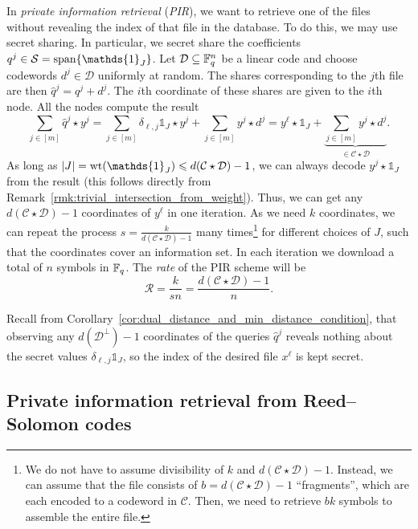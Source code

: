 \documentclass[../main.tex]{subfiles}
\begin{document}
In \emph{private information retrieval} (\emph{PIR}), we want to retrieve one of the files without revealing the index of that file in the database. To do this, we may use secret sharing. In particular, we secret share the coefficients $q^j \in \mathcal{S} = \spn\{\mathds{1}_J\}$. Let $\mathcal{D} \subseteq \mathbb{F}_q^n$ be a linear code and choose codewords $d^j \in \mathcal{D}$ uniformly at random. The shares corresponding to the $j$th file are then $\hat{q}^j = q^j + d^j$. The $i$th coordinate of these shares are given to the $i$th node. All the nodes compute the result
\begin{equation*}
    \sum_{j \in [m]} \hat{q}^j \star y^j = \sum_{j \in [m]} \delta_{\ell, j} \mathds{1}_J \star y^j + \sum_{j \in [m]} y^j \star d^j = y^\ell \star \mathds{1}_J + \underbrace{\sum_{j \in [m]} y^j \star d^j}_{\in \mathcal{C} \star \mathcal{D}}.
\end{equation*}
As long as $\lvert J \rvert = \wt(\mathds{1}_J) \leq d(\mathcal{C} \star \mathcal{D}) - 1$, we can always decode $y^j \star \mathds{1}_J$ from the result (this follows directly from Remark~\ref{rmk:trivial_intersection_from_weight}). Thus, we can get any $d(\mathcal{C} \star \mathcal{D}) - 1$ coordinates of $y^\ell$ in one iteration. As we need $k$ coordinates, we can repeat the process $s = \tfrac{k}{d(\mathcal{C} \star \mathcal{D}) - 1}$ many times\footnote{We do not have to assume divisibility of $k$ and $d(\mathcal{C} \star \mathcal{D}) - 1$. Instead, we can assume that the file consists of $b = d(\mathcal{C} \star \mathcal{D}) - 1$ ``fragments'', which are each encoded to a codeword in $\mathcal{C}$. Then, we need to retrieve $bk$ symbols to assemble the entire file.} for different choices of $J$, such that the coordinates cover an information set. In each iteration we download a total of $n$ symbols in $\mathbb{F}_q$. The \emph{rate} of the PIR scheme will be
\begin{equation*}
    \mathcal{R} = \frac{k}{sn} = \frac{d(\mathcal{C} \star \mathcal{D}) - 1}{n}.
\end{equation*}

Recall from Corollary~\ref{cor:dual_distance_and_min_distance_condition}, that observing any $d(\mathcal{D}^\perp) - 1$ coordinates of the queries $\hat{q}^j$ reveals nothing about the secret values $\delta_{\ell, j} \mathds{1}_J$, so the index of the desired file $x^\ell$ is kept secret.

\subsection{Private information retrieval from Reed--Solomon codes}
\end{document}
